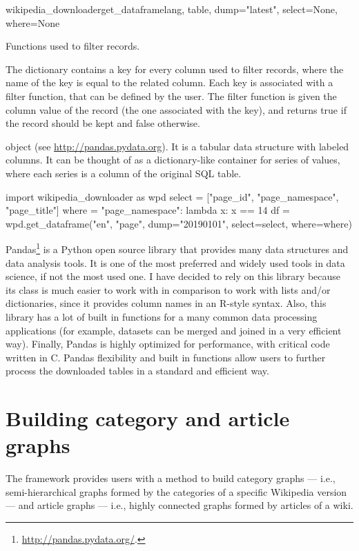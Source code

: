 \begin{functiondoc}{wikipedia\_downloader}{get\_dataframe}{lang, table, dump="latest", select=None, where=None}
\begin{functionparameters}
                    Functions used to filter records.
                    
                    The dictionary contains a key for every column used to filter records, where the name of the key is equal to the related column. Each key is associated with a filter function, that can be defined by the user. The filter function is given the column value of the record (the one associated with the key), and returns true if the record should be kept and false otherwise.
                \end{functionparameters}
                
                \begin{functionoutput}
                     object (see \url{http://pandas.pydata.org}). It is a tabular data structure with labeled columns. It can be thought of as a dictionary-like container for series of values, where each series is a column of the original SQL table.
                \end{functionoutput}

                \begin{functionexample}
import wikipedia_downloader as wpd
select = ["page_id", "page_namespace", "page_title"]
where = {"page_namespace": lambda x: x == 14}
df = wpd.get_dataframe("en", "page",
                       dump="20190101",
                       select=select,
                       where=where)
                \end{functionexample}
            \end{functiondoc}
            
            Pandas\footnote{\url{http://pandas.pydata.org/}.} is a Python open source library that provides many data structures and data analysis tools. It is one of the most preferred and widely used tools in data science, if not the most used one. I have decided to rely on this library because its  class is much easier to work with in comparison to work with lists and/or dictionaries, since it provides column names in an R-style syntax. Also, this library has a lot of built in functions for a many common data processing applications (for example, datasets can be merged and joined in a very efficient way). Finally, Pandas is highly optimized for performance, with critical code written in C. Pandas flexibility and built in functions allow users to further process the downloaded tables in a standard and efficient way.
    \section{Building category and article graphs}
        The framework provides users with a method to build category graphs --- i.e., semi-hierarchical graphs formed by the categories of a specific Wikipedia version --- and article graphs --- i.e., highly connected graphs formed by articles of a wiki.
        
